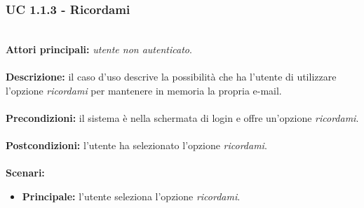 \documentclass[a4paper,11pt]{article}
\begin{document}
\vspace{6 mm}

\subsubsection{UC 1.1.3 - Ricordami}
\ \\
\textbf{Attori principali:} \textit{utente non autenticato}.\\
\\
\textbf{Descrizione:} il caso d'uso descrive la possibilità che ha l'utente di utilizzare l'opzione \textit{ricordami} per mantenere in memoria la propria e-mail. \\
\\
\textbf{Precondizioni:} il sistema è nella schermata di login e offre un'opzione \textit{ricordami}.\\
\\
\textbf{Postcondizioni:} l'utente ha selezionato l'opzione \textit{ricordami}. \\
\\
\textbf{Scenari:}
\begin{itemize}
\item \textbf{Principale:} l'utente seleziona l'opzione \textit{ricordami}.
\end{itemize}

\newpage
\end{document}
